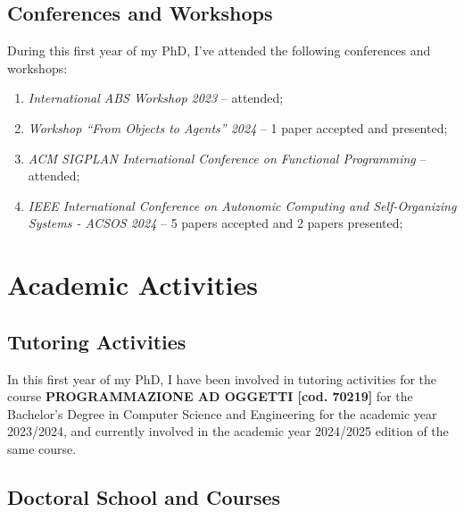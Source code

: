 \documentclass[runningheads]{llncs}
\begin{document}
\subsection{Conferences and Workshops}

During this first year of my PhD,
I've attended the following conferences and workshops:

\begin{enumerate}
    \item \emph{International ABS Workshop 2023} -- attended;
    \item \emph{Workshop ``From Objects to Agents'' 2024} -- 1 paper accepted and presented;
    \item \emph{ACM SIGPLAN International Conference on Functional Programming} -- attended;
    \item \emph{IEEE International Conference on Autonomic Computing and Self-Organizing Systems - ACSOS 2024} -- 5 papers accepted and 2 papers presented;
\end{enumerate}



\section{Academic Activities}

\subsection{Tutoring Activities}

In this first year of my PhD,
I have been involved in tutoring activities for the course \textbf{PROGRAMMAZIONE AD OGGETTI [cod. 70219]} for the Bachelor's Degree in Computer Science and Engineering for the academic year 2023/2024,
and currently involved in the academic year 2024/2025 edition of the same course.

\subsection{Doctoral School and Courses}
\end{document}
